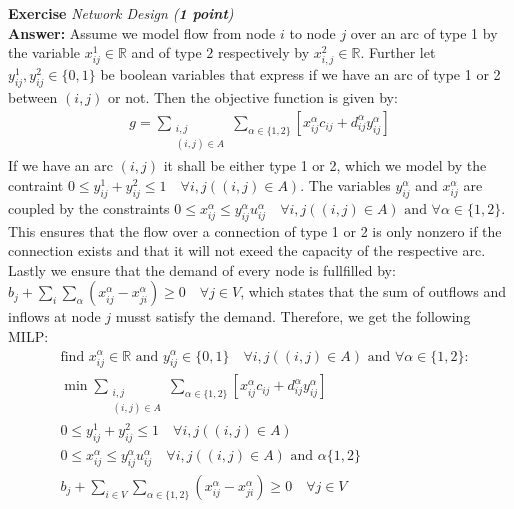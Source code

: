 \documentclass[a4paper,10pt]{article}
\newcounter{exc}
\newenvironment{exercise}[1]%
{\refstepcounter{exc}\textbf{Exercise \arabic{exc}} \emph{#1}\\}
{

\hrulefill\medskip}%
\begin{document}
\begin{exercise}{Network Design (\textbf{1 point})}
\textbf{Answer:}
  Assume we model flow  from node $i$ to node $j$ over an arc of type 1 by the variable $x^1_{ij} \in \mathbb{R}$ and of type $2$ respectively by $x^2_{i,j}\in\mathbb{R}$. Further let $y^1_{ij}, y^2_{ij}\in\{0,1\}$ be boolean variables that express if we have an arc of type 1 or 2 between $(i,j)$ or not. Then the objective function is given by:
\begin{align}
  g = \sum\limits_{\substack{i,j \\ (i,j)\in A}}  \sum\limits_{\alpha\in\{1,2\}} \left[x^\alpha_{ij}c_{ij}+d^\alpha_{ij}y^\alpha_{ij}\right]
\end{align}
  If we have an arc $(i,j)$ it shall be either type 1 or 2, which we model by the contraint $0\leq y^1_{ij}+y^2_{ij}\leq 1 \quad \forall i,j((i,j)\in A) $. The variables $y^\alpha_{ij}$ and $x^\alpha_{ij}$ are coupled by the constraints $0\leq x^\alpha_{ij}\leq y^\alpha_{ij}u^\alpha_{ij}\quad \forall  i,j((i,j)\in A) \text{ and } \forall \alpha\in\{1,2\}$. This ensures that the flow over a connection of type 1 or 2 is only nonzero if the connection exists and that it will not exeed the capacity of the respective arc. Lastly we ensure that the demand of every node is fullfilled by: $ b_j+\sum\limits_i \sum\limits_\alpha (x_{ij}^\alpha - x^\alpha_{ji}) \geq 0\quad \forall j\in V$, which states that the sum of outflows and inflows at node $j$ musst satisfy the demand.
Therefore, we get the following MILP:
\begin{align}
  &  \text{find } x_{ij}^\alpha\in\mathbb{R} \text{ and } y_{ij}^\alpha \in\{0,1\}\quad\forall i,j((i,j)\in A) \text{ and } \forall \alpha\in\{1,2\}:\\
  & \min \sum\limits_{\substack{i,j \\ (i,j)\in A}}  \sum\limits_{\alpha\in\{1,2\}} \left[x^\alpha_{ij}c_{ij}+d^\alpha_{ij}y^\alpha_{ij}\right] \\
  & 0\leq y^1_{ij}+y^2_{ij} \leq 1 \quad \forall i,j((i,j)\in A) \\
  & 0\leq x^\alpha_{ij} \leq y^\alpha_{ij}u^\alpha_{ij}\quad \forall i,j((i,j)\in A)\text{ and }\alpha\{1,2\}\\
  & b_j+\sum\limits_{i\in V} \sum\limits_{\alpha\in\{1,2\}} (x_{ij}^\alpha - x^\alpha_{ji}) \geq 0 \quad \forall j\in V 
\end{align}


\end{exercise}
\end{document}
